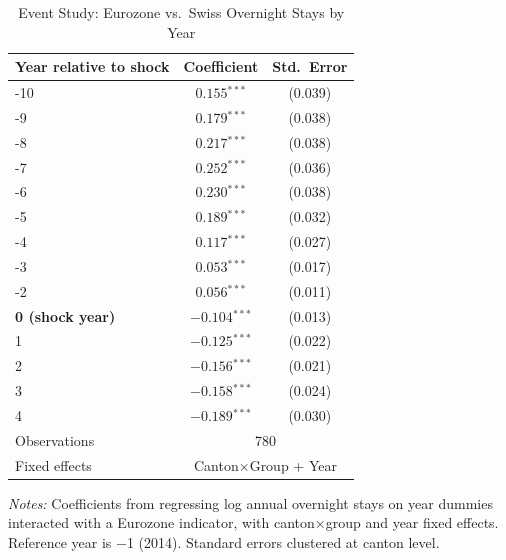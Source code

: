 \begin{table}[t]
\begin{threeparttable}
\centering
\caption{Event Study: Eurozone vs.\ Swiss Overnight Stays by Year}
\label{tab:event}
\begin{tabular}{lcc}
\toprule
Year relative to shock & Coefficient & Std.\ Error \\
\midrule
-10 & $0.155$$^{***}$ & (0.039) \\
-9 & $0.179$$^{***}$ & (0.038) \\
-8 & $0.217$$^{***}$ & (0.038) \\
-7 & $0.252$$^{***}$ & (0.036) \\
-6 & $0.230$$^{***}$ & (0.038) \\
-5 & $0.189$$^{***}$ & (0.032) \\
-4 & $0.117$$^{***}$ & (0.027) \\
-3 & $0.053$$^{***}$ & (0.017) \\
-2 & $0.056$$^{***}$ & (0.011) \\
\midrule
\textbf{0 (shock year)} & $-0.104$$^{***}$ & (0.013) \\
1 & $-0.125$$^{***}$ & (0.022) \\
2 & $-0.156$$^{***}$ & (0.021) \\
3 & $-0.158$$^{***}$ & (0.024) \\
4 & $-0.189$$^{***}$ & (0.030) \\
\midrule
Observations & \multicolumn{2}{c}{780} \\
Fixed effects & \multicolumn{2}{c}{Canton$\times$Group + Year} \\
\bottomrule
\end{tabular}
\begin{tablenotes}
\item \textit{Notes:} Coefficients from regressing log annual overnight stays on year dummies interacted with a Eurozone indicator, with canton$\times$group and year fixed effects. Reference year is $-$1 (2014). Standard errors clustered at canton level.
\end{tablenotes}
\end{threeparttable}
\end{table}
